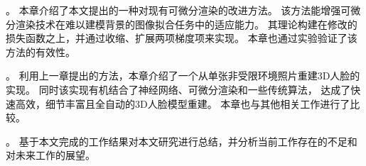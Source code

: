 。
本章介绍了本文提出的一种对现有可微分渲染的改进方法。
该方法能增强可微分渲染技术在难以建模背景的图像拟合任务中的适应能力。
其理论构建在修改的损失函数之上，并通过收缩、扩展两项梯度项来实现。
本章也通过实验验证了该方法的有效性。

。
利用上一章提出的方法，本章介绍了一个从单张非受限环境照片重建3D人脸的实现。
同时该实现有机结合了神经网络、可微分渲染和一些传统算法，
达成了快速高效，细节丰富且全自动的3D人脸模型重建。
本章也与其他相关工作进行了比较。

。
基于本文完成的工作结果对本文研究进行总结，并分析当前工作存在的不足和对未来工作的展望。
